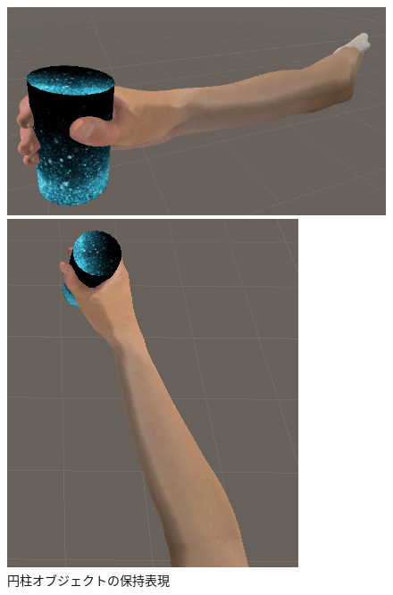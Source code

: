 \documentclass{ltjsreport}
\begin{document}
		\begin{figure}[H]
		\centering
		\begin{minipage}{0.4\columnwidth}
		\centering
		\includegraphics[width = \columnwidth]{../figs/grapcylinder_side.png}
		\end{minipage}
		\hspace{0.04\columnwidth}
		\begin{minipage}{0.2\columnwidth}
		\centering
		\includegraphics[width = \columnwidth]{../figs/grapcylinder_up.png}
		\end{minipage}
		\caption{円柱オブジェクトの保持表現}
		\label{fig:cylinderhold}
		\end{figure}
		\vspace{-15pt}
\end{document}
